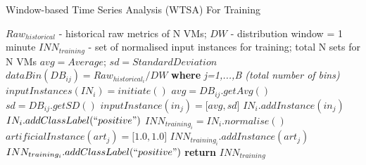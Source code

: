 \begin{algorithm}
\caption{Window-based Time Series Analysis (WTSA) For Training}
\label{raids_algorithm_pre-processing_1}
\algnewcommand{}
\algnewcommand{}
\algnewcommand{}
\algnewcommand\INPUT{\item[\algorithmicinput]}
\algnewcommand\OUTPUT{\item[\algorithmicoutput]}
\algnewcommand\ABB{\item[\algorithmicabb]}

\begin{algorithmic}[1]
\INPUT $Raw_{historical}$ - historical raw metrics of N VMs; $DW$ - distribution window = 1 minute
\OUTPUT $INN_{training}$ - set of normalised input instances for training; total N sets for N VMs
\ABB 
$avg = Average$; $sd = Standard Deviation$
\Statex
{}
\State $dataBin(DB_{ij}) = Raw_{historical_i} / DW$ \thinspace \thinspace \thinspace \thinspace \textbf{where} \textit{j=1,...,B (total number of bins)}
\State $inputInstances(IN_i)=initiate()$
\State $avg=DB_{ij}.getAvg()$
\State $sd=DB_{ij}.getSD()$
\State $inputInstance(in_j)=\big[avg, sd\big]$
\State $IN_i.addInstance(in_j)$
\State $IN_i.addClassLabel(``positive")$
\EndFor
\State $INN_{training_i} = IN_i.normalise() $ 
\State $artificialInstance(art_j)=\big[1.0, 1.0\big]$ %
\State $INN_{training_i}.addInstance(art_j)$
\State $INN_{training_i}.addClassLabel(``positive")$
\EndFor 
\EndFor
\State \textbf{return} $INN_{training}$ \newline
\end{algorithmic}
\end{algorithm}


